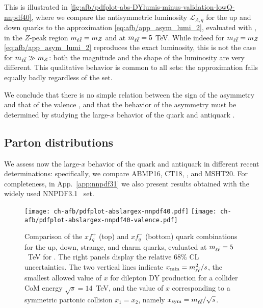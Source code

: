 This is illustrated in
\cref{fig:afb/pdfplot-abs-DYlumis-minus-validation-lowQ-nnpdf40},
where we compare the antisymmetric luminosity $\mathcal{L}_{A,q}$
for the up and down quarks 
to the approximation
\cref{eq:afb/app_asym_lumi_2}, evaluated with  \nnlo,
in the $Z$-peak region $m_{\ell\bar{\ell}}=m_Z$ 
and at $m_{\ell\bar{\ell}}=5$ TeV.
%
While indeed for $m_{\ell\bar{\ell}}=m_Z$ \cref{eq:afb/app_asym_lumi_2} reproduces
the exact luminosity, this is not the case for $m_{\ell\bar{\ell}}\gg m_Z$: both
the magnitude and the shape of the luminosity are  very different.
%
This qualitative behavior is common to all \pdf sets: the approximation
fails equally badly regardless of the \pdf set.

We conclude that there
is no simple relation between the sign of the asymmetry and that of
the valence \pdf, and that the
behavior of the asymmetry must be determined by studying the large-$x$
behavior of the quark and antiquark \pdfs.

\subsection{Parton distributions}
\label{sec:afb/subsec-largexPDFs}

We assess now the large-$x$ behavior of
the quark and antiquark \pdfs in different recent \pdf
determinations: specifically, we compare
 ABMP16,
 CT18,  ,
 and MSHT20.
%
 For
completeness, in App.~\ref{app:nnpdf31} we also present results
obtained with the widely used NNPDF3.1~\cite{Ball:2017nwa} set.

\begin{figure}[!t]
 \centering
 \texttt{[image: ch-afb/pdfplot-abslargex-nnpdf40.pdf]}
 \texttt{[image: ch-afb/pdfplot-abslargex-nnpdf40-valence.pdf]}
 \caption{\small Comparison of the $xf^+_q$ (top) and $xf_q^-$ (bottom) quark
   \pdf combinations for the up, down, strange, and charm quarks,
   evaluated at $m_{\ell\bar{\ell}}=5$~TeV for  \nnlo.
   The right panels display the relative 68\% CL uncertainties.
   The two vertical lines indicate $x_{\rm min}=m_{\ell\bar{\ell}}^2/s$, the
   smallest allowed value of $x$ 
   for dilepton DY production for a collider
   CoM energy $\sqrt{s}=14$~TeV, and the value of $x$
   corresponding to a symmetric partonic collision $x_1=x_2$, namely
 $x_{\rm  sym}=m_{\ell\bar{\ell}}/\sqrt{s}$.
 }    
 \label{fig:afb/pdfplot-abslargex}
\end{figure}


